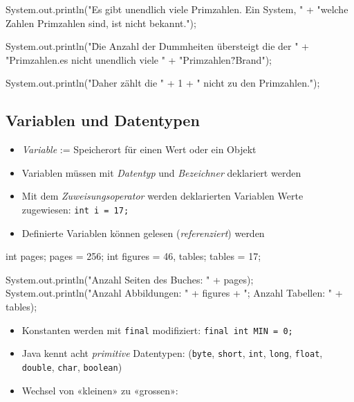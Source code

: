 \documentclass[a4paper,10pt, dvipsnames]{report}
\newcommand{\javaInLine}[1]{\texttt{#1}}
\begin{document}
\begin{javacodebox}
System.out.println("Es gibt unendlich viele Primzahlen. Ein System, "
        + "welche Zahlen Primzahlen sind, ist nicht bekannt.");

System.out.println("\"Die Anzahl der Dummheiten übersteigt die der "
        + "Primzahlen.\nGibt es nicht unendlich viele "
        + "Primzahlen?\"\n\tGregor Brand");

System.out.println("Daher zählt die " + 1 + " nicht zu den Primzahlen.");
\end{javacodebox}

\subsection{Variablen und Datentypen}

\begin{itemize}
	\item \textit{Variable} := Speicherort für einen Wert oder ein Objekt
	\item Variablen müssen mit \textit{Datentyp} und \textit{Bezeichner} deklariert werden
	\item Mit dem \textit{Zuweisungsoperator} werden deklarierten Variablen Werte zugewiesen: \javaInLine{int i = 17;}
	\item Definierte Variablen können gelesen (\textit{referenziert}) werden
\end{itemize}

\begin{javacodebox}
int pages;
pages = 256;
int figures = 46, tables;
tables = 17;

System.out.println("Anzahl Seiten des Buches: " + pages);
System.out.println("Anzahl Abbildungen: " + figures
+ "; Anzahl Tabellen: " + tables);
\end{javacodebox}

\begin{itemize}
	\item Konstanten werden mit \javaInLine{final} modifiziert: \javaInLine{final int MIN = 0;}
\end{itemize}

\begin{itemize}
	\item Java kennt acht \textit{primitive} Datentypen: (\javaInLine{byte}, \javaInLine{short}, \javaInLine{int}, \javaInLine{long}, \javaInLine{float}, \javaInLine{double}, \javaInLine{char}, \javaInLine{boolean})
	\item Wechsel von «kleinen» zu «grossen»:
\end{itemize}
\end{document}
